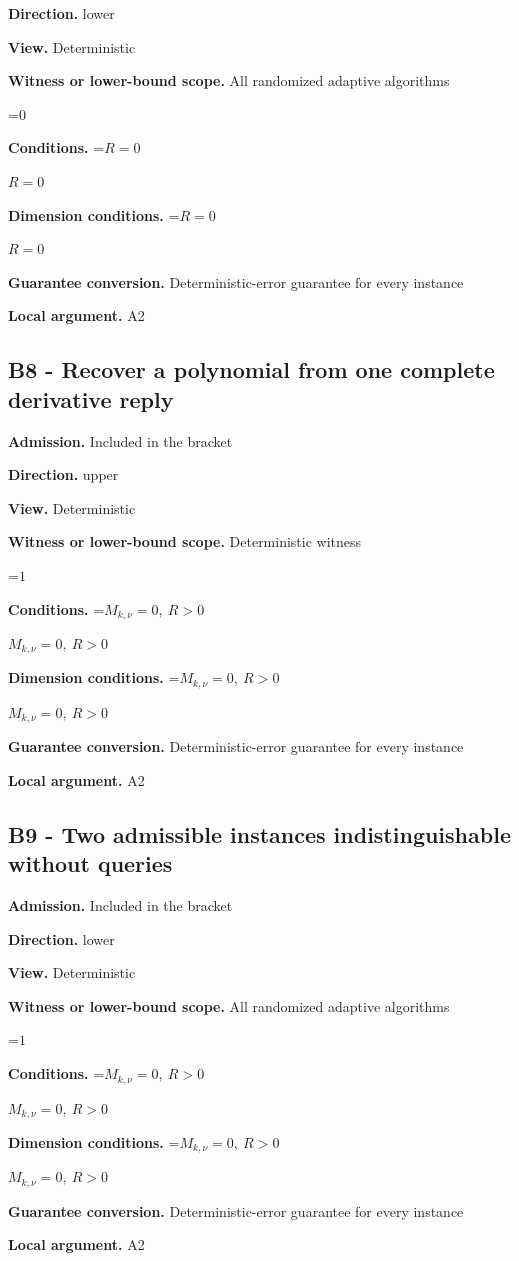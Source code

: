 \documentclass[10pt,a4paper]{article}
\newcommand{\AtlasMath}[1]{\par\begingroup\centering\setbox0=\hbox{$\displaystyle #1$}\ifdim\wd0>1.4\linewidth\typeout{ATLAS WIDE FORMULA: \the\wd0}\fi\ifdim\wd0>\linewidth\resizebox{\linewidth}{!}{\box0}\else\box0\fi\par\endgroup}
\newcommand{\AtlasInlineMath}[1]{\begingroup\setbox0=\hbox{$#1$}\ifdim\wd0>.4\linewidth\endgroup\AtlasMath{#1}\else\endgroup$#1$\fi}
\begin{document}
\textbf{Direction.} lower

\textbf{View.} Deterministic

\textbf{Witness or lower-bound scope.} All randomized adaptive algorithms

\AtlasMath{0}
\textbf{Conditions.} \AtlasInlineMath{R=0}

\textbf{Dimension conditions.} \AtlasInlineMath{R=0}

\textbf{Guarantee conversion.} Deterministic-error guarantee for every instance

\textbf{Local argument.} A2

\subsection{B8 - Recover a polynomial from one complete derivative reply}
\textbf{Admission.} Included in the bracket

\textbf{Direction.} upper

\textbf{View.} Deterministic

\textbf{Witness or lower-bound scope.} Deterministic witness

\AtlasMath{1}
\textbf{Conditions.} \AtlasInlineMath{M_{k,\nu}=0,\ R>0}

\textbf{Dimension conditions.} \AtlasInlineMath{M_{k,\nu}=0,\ R>0}

\textbf{Guarantee conversion.} Deterministic-error guarantee for every instance

\textbf{Local argument.} A2

\subsection{B9 - Two admissible instances indistinguishable without queries}
\textbf{Admission.} Included in the bracket

\textbf{Direction.} lower

\textbf{View.} Deterministic

\textbf{Witness or lower-bound scope.} All randomized adaptive algorithms

\AtlasMath{1}
\textbf{Conditions.} \AtlasInlineMath{M_{k,\nu}=0,\ R>0}

\textbf{Dimension conditions.} \AtlasInlineMath{M_{k,\nu}=0,\ R>0}

\textbf{Guarantee conversion.} Deterministic-error guarantee for every instance

\textbf{Local argument.} A2
\end{document}
